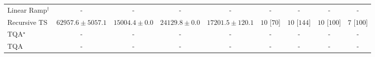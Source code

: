 \begin{tabular}{l|cccc|cccc|}
Linear Ramp$^\dagger$ & {\cellcolor[HTML]{000000}} \color[HTML]{F1F1F1} {\cellcolor{white}} \color{black} - & {\cellcolor[HTML]{000000}} \color[HTML]{F1F1F1} {\cellcolor{white}} \color{black} - & {\cellcolor[HTML]{000000}} \color[HTML]{F1F1F1} {\cellcolor{white}} \color{black} - & {\cellcolor[HTML]{000000}} \color[HTML]{F1F1F1} {\cellcolor{white}} \color{black} - & {\cellcolor[HTML]{000000}} \color[HTML]{F1F1F1} {\cellcolor{white}} \color{black} - & {\cellcolor[HTML]{000000}} \color[HTML]{F1F1F1} {\cellcolor{white}} \color{black} - & {\cellcolor[HTML]{000000}} \color[HTML]{F1F1F1} {\cellcolor{white}} \color{black} - & {\cellcolor[HTML]{000000}} \color[HTML]{F1F1F1} {\cellcolor{white}} \color{black} - \\
Recursive TS & {\cellcolor[HTML]{036B38}} \color[HTML]{F1F1F1} $62957.6\pm 5057.1$ & {\cellcolor[HTML]{FDFED9}} \color[HTML]{000000} $15004.4\pm 0.0$ & {\cellcolor[HTML]{E7F6AD}} \color[HTML]{000000} $24129.8\pm 0.0$ & {\cellcolor[HTML]{FAFDCC}} \color[HTML]{000000} $17201.5\pm 120.1$ & {\cellcolor[HTML]{49006A}} \color[HTML]{F1F1F1} $10$ [$70$] & {\cellcolor[HTML]{49006A}} \color[HTML]{F1F1F1} $10$ [$144$] & {\cellcolor[HTML]{49006A}} \color[HTML]{F1F1F1} $10$ [$100$] & {\cellcolor[HTML]{CD238F}} \color[HTML]{F1F1F1} $7$ [$100$] \\
TQA$^\star$ & {\cellcolor[HTML]{000000}} \color[HTML]{F1F1F1} {\cellcolor{white}} \color{black} - & {\cellcolor[HTML]{000000}} \color[HTML]{F1F1F1} {\cellcolor{white}} \color{black} - & {\cellcolor[HTML]{000000}} \color[HTML]{F1F1F1} {\cellcolor{white}} \color{black} - & {\cellcolor[HTML]{000000}} \color[HTML]{F1F1F1} {\cellcolor{white}} \color{black} - & {\cellcolor[HTML]{000000}} \color[HTML]{F1F1F1} {\cellcolor{white}} \color{black} - & {\cellcolor[HTML]{000000}} \color[HTML]{F1F1F1} {\cellcolor{white}} \color{black} - & {\cellcolor[HTML]{000000}} \color[HTML]{F1F1F1} {\cellcolor{white}} \color{black} - & {\cellcolor[HTML]{000000}} \color[HTML]{F1F1F1} {\cellcolor{white}} \color{black} - \\
TQA & {\cellcolor[HTML]{000000}} \color[HTML]{F1F1F1} {\cellcolor{white}} \color{black} - & {\cellcolor[HTML]{000000}} \color[HTML]{F1F1F1} {\cellcolor{white}} \color{black} - & {\cellcolor[HTML]{000000}} \color[HTML]{F1F1F1} {\cellcolor{white}} \color{black} - & {\cellcolor[HTML]{000000}} \color[HTML]{F1F1F1} {\cellcolor{white}} \color{black} - & {\cellcolor[HTML]{000000}} \color[HTML]{F1F1F1} {\cellcolor{white}} \color{black} - & {\cellcolor[HTML]{000000}} \color[HTML]{F1F1F1} {\cellcolor{white}} \color{black} - & {\cellcolor[HTML]{000000}} \color[HTML]{F1F1F1} {\cellcolor{white}} \color{black} - & {\cellcolor[HTML]{000000}} \color[HTML]{F1F1F1} {\cellcolor{white}} \color{black} - \\

\end{tabular}
